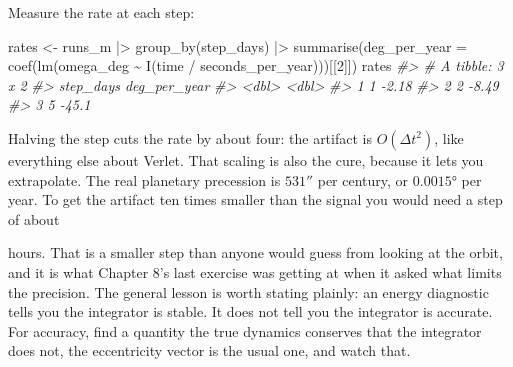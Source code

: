 \documentclass[
  10.5pt,
  letterpaper,
]{scrbook}
\newenvironment{Shaded}{\begin{snugshade}}{\end{snugshade}}
\newcommand{\AttributeTok}[1]{\textcolor[rgb]{0.00,0.00,0.00}{#1}}
\newcommand{\CommentTok}[1]{\textcolor[rgb]{0.00,0.00,0.00}{\textit{#1}}}
\newcommand{\DecValTok}[1]{\textcolor[rgb]{0.00,0.00,0.00}{#1}}
\newcommand{\FloatTok}[1]{\textcolor[rgb]{0.00,0.00,0.00}{#1}}
\newcommand{\FunctionTok}[1]{\textcolor[rgb]{0.00,0.00,0.00}{#1}}
\newcommand{\NormalTok}[1]{\textcolor[rgb]{0.00,0.00,0.00}{#1}}
\newcommand{\OtherTok}[1]{\textcolor[rgb]{0.00,0.00,0.00}{#1}}
\newcommand{\SpecialCharTok}[1]{\textcolor[rgb]{0.00,0.00,0.00}{#1}}
\theoremstyle{plain}
\theoremstyle{remark}
\begin{document}
Measure the rate at each step:

\begin{Shaded}
\begin{Highlighting}[]
\NormalTok{rates }\OtherTok{\textless{}{-}}\NormalTok{ runs\_m }\SpecialCharTok{|\textgreater{}}
  \FunctionTok{group\_by}\NormalTok{(step\_days) }\SpecialCharTok{|\textgreater{}}
  \FunctionTok{summarise}\NormalTok{(}\AttributeTok{deg\_per\_year =} \FunctionTok{coef}\NormalTok{(}\FunctionTok{lm}\NormalTok{(omega\_deg }\SpecialCharTok{\textasciitilde{}} \FunctionTok{I}\NormalTok{(time }\SpecialCharTok{/}\NormalTok{ seconds\_per\_year)))[[}\DecValTok{2}\NormalTok{]])}
\NormalTok{rates}
\CommentTok{\#\textgreater{} \# A tibble: 3 x 2}
\CommentTok{\#\textgreater{}   step\_days deg\_per\_year}
\CommentTok{\#\textgreater{}       \textless{}dbl\textgreater{}        \textless{}dbl\textgreater{}}
\CommentTok{\#\textgreater{} 1         1        {-}2.18}
\CommentTok{\#\textgreater{} 2         2        {-}8.49}
\CommentTok{\#\textgreater{} 3         5       {-}45.1}
\end{Highlighting}
\end{Shaded}

Halving the step cuts the rate by about four: the artifact is
\(O(\Delta t^2)\), like everything else about Verlet. That scaling is
also the cure, because it lets you extrapolate. The real planetary
precession is \(531''\) per century, or \(0.0015°\) per year. To get the
artifact ten times smaller than the signal you would need a step of
about

\begin{Shaded}
\end{Shaded}

hours. That is a smaller step than anyone would guess from looking at
the orbit, and it is what Chapter 8's last exercise was getting at when
it asked what limits the precision. The general lesson is worth stating
plainly: an energy diagnostic tells you the integrator is stable. It
does not tell you the integrator is accurate. For accuracy, find a
quantity the true dynamics conserves that the integrator does not, the
eccentricity vector is the usual one, and watch that.
\end{document}
